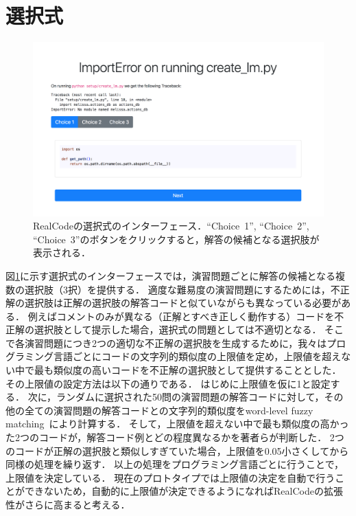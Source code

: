 

\section{選択式}
\begin{figure}[t]
	\centering
  \includegraphics[width=1.0\columnwidth]{20181228-interface-mcq.png}
  \caption{RealCodeの選択式のインターフェース．``Choice~1'', ``Choice~2'', ``Choice~3''のボタンをクリックすると，解答の候補となる選択肢が表示される．}
  \label{fig:mcq}
\end{figure}

図\ref{fig:mcq}に示す選択式のインターフェースでは，演習問題ごとに解答の候補となる複数の選択肢（3択）を提供する．
適度な難易度の演習問題にするためには，不正解の選択肢は正解の選択肢の解答コードと似ていながらも異なっている必要がある．
例えばコメントのみが異なる（正解とすべき正しく動作する）コードを不正解の選択肢として提示した場合，選択式の問題としては不適切となる．
そこで各演習問題につき2つの適切な不正解の選択肢を生成するために，我々はプログラミング言語ごとにコードの文字列的類似度の上限値を定め，上限値を超えない中で最も類似度の高いコードを不正解の選択肢として提供することとした．
その上限値の設定方法は以下の通りである．
はじめに上限値を仮に1と設定する．
次に，ランダムに選択された50問の演習問題の解答コードに対して，その他の全ての演習問題の解答コードとの文字列的類似度をword-level fuzzy matching~\cite{sankoff1983time}により計算する．
そして，上限値を超えない中で最も類似度の高かった2つのコードが，解答コード例とどの程度異なるかを著者らが判断した．
2つのコードが正解の選択肢と類似しすぎていた場合，上限値を0.05小さくしてから同様の処理を繰り返す．
以上の処理をプログラミング言語ごとに行うことで，上限値を決定している．
現在のプロトタイプでは上限値の決定を自動で行うことができないため，自動的に上限値が決定できるようになればRealCodeの拡張性がさらに高まると考える．



